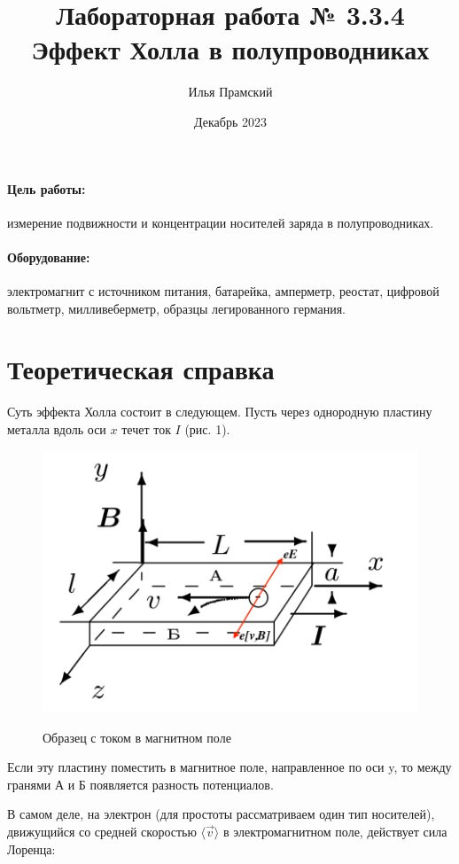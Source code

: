 \documentclass[a4paper,12pt]{article}
\title{Лабораторная работа № 3.3.4\\Эффект Холла в полупроводниках}
\author{Илья Прамский}
\date{Декабрь 2023}
\begin{document}
\maketitle
\newpage

\paragraph*{Цель работы:} измерение подвижности и концентрации носителей заряда в полупроводниках.
	
	\paragraph*{Оборудование:} электромагнит с источником питания, батарейка, амперметр, реостат, цифровой вольтметр, милливеберметр, образцы легированного германия.
	
	\section{Теоретическая справка}
	Суть эффекта Холла состоит в следующем. Пусть через однородную пластину металла вдоль оси $x$ течет ток $I$ (рис. 1).
	
	\begin{figure}
		\vspace{-20pt}
		\begin{center}
			\includegraphics[width=0.7\linewidth]{Holl1.png}
			\label{fig:sdfsafd}
		\end{center}
		\vspace{-20pt}
		\caption{Образец с током в магнитном поле}
	\end{figure}

	Если эту пластину поместить в магнитное поле, направленное по оси y, то между гранями А и Б появляется разность потенциалов. 
	
	В самом деле, на электрон (для простоты рассматриваем один тип носителей), движущийся со средней скоростью $\langle \vec{v} \rangle$ в электромагнитном поле, действует сила Лоренца:
	
\end{document}
